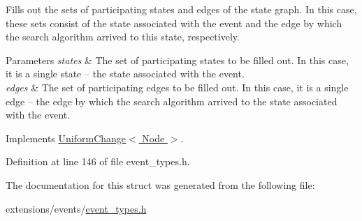Fills out the sets of participating states and edges of the state graph. In this case, these sets consist of the state associated with the event and the edge by which the search algorithm arrived to this state, respectively. 


\begin{DoxyParams}{Parameters}
{\em states} & The set of participating states to be filled out. In this case, it is a single state -- the state associated with the event. \\
\hline
{\em edges} & The set of participating edges to be filled out. In this case, it is a single edge -- the edge by which the search algorithm arrived to the state associated with the event. \\
\hline
\end{DoxyParams}


Implements \hyperlink{structUniformChange_aabe64e47649e99afee7a67969eb98c90}{Uniform\+Change$<$ Node $>$}.



Definition at line 146 of file event\+\_\+types.\+h.



The documentation for this struct was generated from the following file\+:\begin{DoxyCompactItemize}
\item 
extensions/events/\hyperlink{event__types_8h}{event\+\_\+types.\+h}\end{DoxyCompactItemize}
